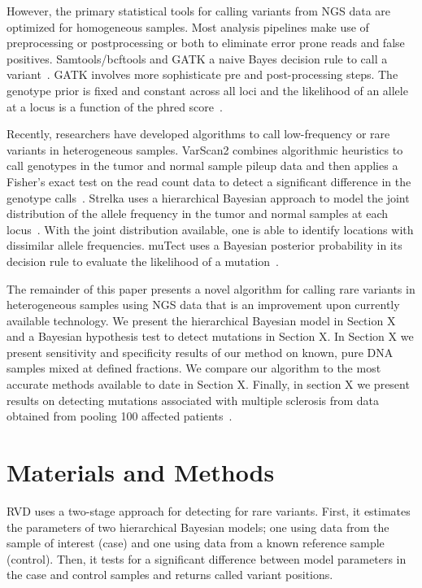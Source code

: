 \documentclass[11pt,reqno]{amsart}
\begin{document}
However, the primary statistical tools for calling variants from NGS data are optimized for homogeneous samples. Most analysis pipelines make use of preprocessing or postprocessing or both to eliminate error prone reads and false positives. Samtools/bcftools and GATK a naive Bayes decision rule to call a variant~\citep{}. GATK involves more sophisticate pre and post-processing steps. The genotype prior is fixed and constant across all loci and the likelihood of an allele at a locus is a function of the phred score~\citep{McKenna:2010bv}.

Recently, researchers have developed algorithms to call low-frequency or rare variants in heterogeneous samples.  VarScan2 combines algorithmic heuristics to call genotypes in the tumor and normal sample pileup data and then applies a Fisher's exact test on the read count data to detect a significant difference in the genotype calls~\citep{Koboldt:2012cg}. Strelka uses a hierarchical Bayesian approach to model the joint distribution of the allele frequency in the tumor and normal samples at each locus~\citep{Saunders}. With the joint distribution available, one is able to identify locations with dissimilar allele frequencies. muTect uses a Bayesian posterior probability in its decision rule to evaluate the likelihood of a mutation~\citep{Cibulskis}.

The remainder of this paper presents a novel algorithm for calling rare variants in heterogeneous samples using NGS data that is an improvement upon currently available technology. We present the hierarchical Bayesian model in Section X and a Bayesian hypothesis test to detect mutations in Section X. In Section X we present sensitivity and specificity results of our method on known, pure DNA samples mixed at defined fractions. We compare our algorithm to the most accurate methods available to date in Section X. Finally, in section X we present results on detecting mutations associated with multiple sclerosis from data obtained from pooling 100 affected patients~\citep{Ferretti:2013hp}.

\section{Materials and Methods}

RVD uses a two-stage approach for detecting for rare variants. First, it estimates the parameters of two hierarchical Bayesian models; one using data from the sample of interest (case) and one using data from a known reference sample (control). Then, it tests for a significant difference between model parameters in the case and control samples and returns called variant positions.
\end{document}
